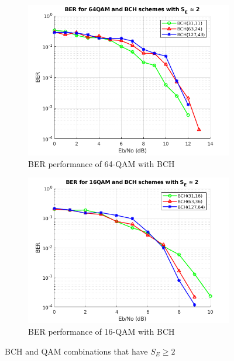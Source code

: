 \documentclass[11pt]{report}
\begin{document}
\setcounter{figure}{6} 
\begin{figure}
	\centering
	
	\begin{subfigure}{.5\textwidth}
		\centering
		\includegraphics[width=\textwidth]{resources/bch64QAM.png}
		\caption{BER performance of 64-QAM with BCH}
	\end{subfigure}%
	\begin{subfigure}{.5\textwidth}	
		\includegraphics[width=\textwidth]{resources/bch16QAM.png}
		\caption{BER performance of 16-QAM with BCH}
	\end{subfigure}
	
	\caption{BCH and QAM combinations that have $S_E  \ge 2$}
	\label{fig:1664}
	
\end{figure}{}
\end{document}
